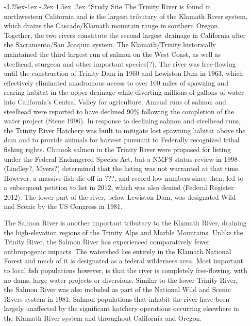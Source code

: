 \documentclass[twoside,10pt,twocolumn]{article}
\makeatletter
\renewcommand\subsection{\@startsection{subsection}{2}{\z@}%
                                     {-3.25ex\@plus -1ex \@minus -.2ex}%
                                     {1.5ex \@plus .2ex}%
                                     {\normalfont\normalsize\itshape}}
\makeatother
\begin{document}
\subsection*{Study Site}
The Trinity River is found in northwestern California and is the largest tributary of the Klamath River system, which drains the Cascade/Klamath mountain range in southern Oregon.  Together, the two rivers constitute the second largest drainage in California after the Sacramento/San Joaquin system. The Klamath/Trinity historically maintained the third largest run of salmon on the West Coast, as well as steelhead, sturgeon and other important species(?). The river was free-flowing until the construction of Trinity Dam in 1960 and Lewiston Dam in 1963, which effectively eliminated anadromous access to over 100 miles of spawning and rearing habitat in the upper drainage while diverting millions of gallons of water into California's Central Valley for agriculture. Annual runs of salmon and steelhead were reported to have declined 90\% following the completion of the water project (Stene 1996). In response to declining salmon and steelhead runs, the Trinity River Hatchery was built to mitigate lost spawning habitat above the dam and to provide animals for harvest pursuant to Federally recognized tribal fishing rights. 
Chinook salmon in the Trinity River were proposed for listing under the Federal Endangered Species Act, but a NMFS status review in 1998 (Lindley?, Myers?)  determined that the listing was not warranted at that time.  However, a massive fish die-off in ???, and record low numbers since then, led to a subsequent petition to list in 2012, which was also denied (Federal Register 2012). The lower part of the river, below Lewiston Dam, was designated Wild and Scenic by the US Congress in 1981.

The Salmon River is another important tributary to the Klamath River, draining the high-elevation regions of the Trinity Alps and Marble Mountains. Unlike the Trinity River, the Salmon River has experienced comparatively fewer anthropogenic impacts. The watershed lies entirely in the Klamath National Forest and much of it is designated as a federal wilderness area. Most important to local fish populations however, is that the river is completely free-flowing, with no dams, large water projects or diversions. Similar to the lower Trinity River, the Salmon River was also included as part of the National Wild and Scenic Rivers system in 1981. Salmon populations that inhabit the river have been largely unaffected by the significant hatchery operations occurring elsewhere in the Klamath River system and throughout California and Oregon.
\end{document}
